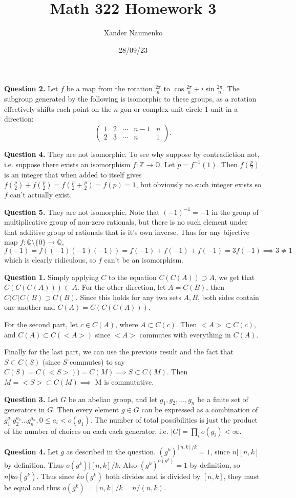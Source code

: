 \documentclass[letterpaper, reqno,11pt]{article}
\begin{document}
\title{Math 322 Homework 3}
\date{28/09/23}
\author{Xander Naumenko}
\maketitle

{\medskip\noindent\bf Question 2.} Let $f$ be a map from the rotation $\frac{2\pi}{n}$ to $\cos \frac{2\pi}{n}+i\sin \frac{2\pi}{n}$. The subgroup generated by the following is isomorphic to these groups, as a rotation effectively shifts each point on the $n$-gon or complex unit circle 1 unit in a direction:
\[
    \begin{pmatrix} 1&2&\cdots&n-1&n\\ 2&3&\cdots&n&1
     \end{pmatrix} 
.\]

{\medskip\noindent\bf Question 4.} They are not isomorphic. To see why suppose by contradiction not, i.e. suppose there exists an isomorphism $f:\mathbb{Z}\to \mathbb{Q}$. Let $p=f^{-1}(1)$. Then $f\left( \frac{p}{2} \right) $ is an integer that when added to itself gives $f\left( \frac{p}{2} \right) +f\left( \frac{p}{2} \right) =f\left( \frac{p}{2}+\frac{p}{2} \right) =f(p)=1$, but obviously no such integer exists so $f$ can't actually exist.

{\medskip\noindent\bf Question 5.} They are not isomorphic. Note that $(-1)^{-1}=-1$ in the group of multiplicative group of non-zero rationals, but there is no such element under that additive group of rationals that is it's own inverse. Thus for any bijective map $f:\mathbb{Q}\setminus\{0\}\to\mathbb{Q}$, $f(-1)=f((-1)(-1)(-1))=f(-1)+f(-1)+f(-1)=3f(-1)\implies 3\neq 1$ which is clearly ridiculous, so $f$ can't be an isomorphism.

{\medskip\noindent\bf Question 1.} Simply applying $C$ to the equation $C(C(A))\supset A$, we get that $C(C(C(A)))\subset A$. For the other direction, let $A=C(B)$, then $C(C(C(B)\supset C(B)$. Since this holds for any two sets $A,B$, both sides contain one another and $C(A)=C(C(C(A)))$.

For the second part, let $c\in C(A)$, where $A\subset C(c)$. Then $<A>\subset C(c)$, and $C(A)\subset C(<A>)$ since $<A>$ commutes with everything in $C(A)$.

Finally for the last part, we can use the previous result and the fact that $S\subset C(S)$ (since $S$ commutes) to say $C(S)=C(<S>))=C(M)\implies S\subset C(M)$. Then $M= <S>\subset C(M)\implies$ M is commutative.

{\medskip\noindent\bf Question 3.} Let $G$ be an abelian group, and let $g_1,g_2,\ldots,g_n$ be a finite set of generators in $G$. Then every element $g\in G$ can be expressed as a combination of $g_1^{a_1}g_2^{a_2}\ldots g_n^{a_n},0\leq a_i<o(g_1)$. The number of total possibilities is just the product of the number of choices on each each generator, i.e. $|G|=\prod_i o(g_i)<\infty$.

{\medskip\noindent\bf Question 4.} Let $g$ as described in the question. $(g^{k})^{[n,k]/k}=1$, since $n|[n,k]$ by definition. Thus $o(g^{k})|[n,k]/k$. Also $(g^{k})^{o(g^{k})}=1$ by definition, so $n|ko(g^{k})$. Thus since $ko(g^{k})$ both divides and is divided by $[n,k]$, they must be equal and thus $o(g^{k})=[n,k]/k=n/(n,k)$.
\end{document}
